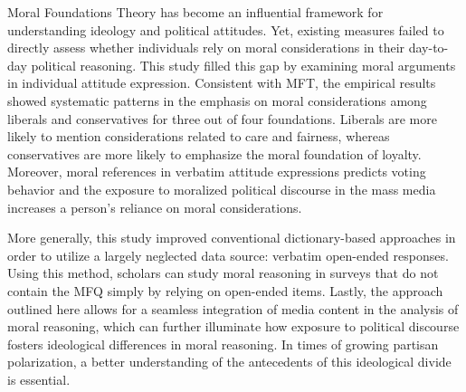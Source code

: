 \documentclass[12pt]{article}
\begin{document}
Moral Foundations Theory has become an influential framework for understanding ideology and political attitudes. Yet, existing measures failed to directly assess whether individuals rely on moral considerations in their day-to-day political reasoning. This study filled this gap by examining moral arguments in individual attitude expression. Consistent with MFT, the empirical results showed systematic patterns in the emphasis on moral considerations among liberals and conservatives for three out of four foundations. Liberals are more likely to mention considerations related to care and fairness, whereas conservatives are more likely to emphasize the moral foundation of loyalty. Moreover, moral references in verbatim attitude expressions predicts voting behavior and the exposure to moralized political discourse in the mass media increases a person's reliance on moral considerations. 

More generally, this study improved conventional dictionary-based approaches in order to utilize a largely neglected data source: verbatim open-ended responses. Using this method, scholars can study moral reasoning in surveys that do not contain the MFQ simply by relying on open-ended items. Lastly, the approach outlined here allows for a seamless integration of media content in the analysis of moral reasoning, which can further illuminate how exposure to political discourse fosters ideological differences in moral reasoning. In times of growing partisan polarization, a better understanding of the antecedents of this ideological divide is essential.







\end{document}
